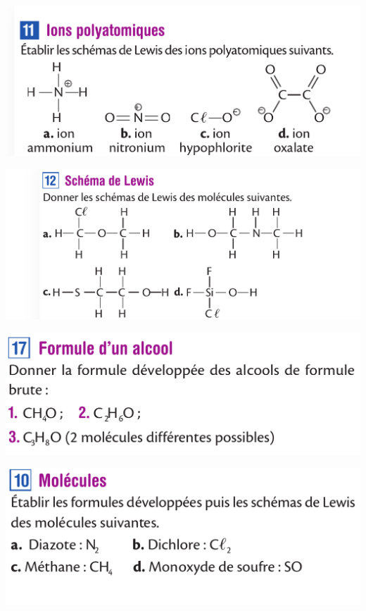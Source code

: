 \documentclass[10pt]{article}
\begin{document}
\begin{center}
\begin{minipage}[c]{0.45\textwidth}
		\includegraphics[scale=0.15]{assets/11.png}

		\includegraphics[scale=0.15]{assets/12.png}

		\includegraphics[scale=0.15]{assets/17.png}


	\end{minipage}
	\hspace{0.05\textwidth}
	\begin{minipage}[c]{0.45\textwidth}
		\centering

		\includegraphics[scale=0.15]{assets/10.png}


\end{minipage}
\end{center}
\end{document}
